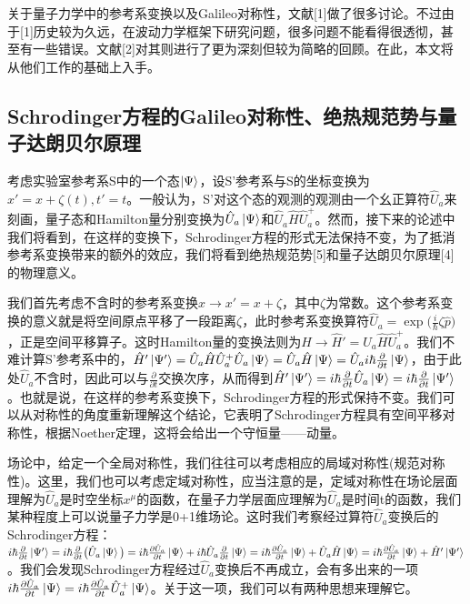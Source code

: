 \documentclass[a4paper]{article}
\begin{document}
        关于量子力学中的参考系变换以及Galileo对称性，文献[1]做了很多讨论。不过由于[1]历史较为久远，在波动力学框架下研究问题，很多问题不能看得很透彻，甚至有一些错误。文献[2]对其则进行了更为深刻但较为简略的回顾。在此，本文将从他们工作的基础上入手。

    \subsection{Schrodinger方程的Galileo对称性、绝热规范势与量子达朗贝尔原理}
        考虑实验室参考系S中的一个态$\ket{\Psi}$，设S'参考系与S的坐标变换为$x'=x+\zeta(t), t'=t$。一般认为，S'对这个态的观测的观测由一个幺正算符$\hat{U}_a$来刻画，量子态和Hamilton量分别变换为$\hat{U}_a\ket{\Psi}$和$\hat{U}_a\hat{H}\hat{U}_a^+$。然而，接下来的论述中我们将看到，在这样的变换下，Schrodinger方程的形式无法保持不变，为了抵消参考系变换带来的额外的效应，我们将看到绝热规范势[5]和量子达朗贝尔原理[4]的物理意义。

        我们首先考虑不含时的参考系变换$x\rightarrow x'=x+\zeta$，其中$\zeta$为常数。这个参考系变换的意义就是将空间原点平移了一段距离$\zeta$，此时参考系变换算符$\hat{U}_a=\exp\big(\frac{i}{\hbar}\zeta\hat{p} \big)$，正是空间平移算子。这时Hamilton量的变换法则为$\hat{H}\rightarrow \hat{H}'=\hat{U}_a\hat{H}\hat{U}_a^+$。我们不难计算S'参考系中的，$\hat{H}'\ket{\Psi'}=\hat{U}_a\hat{H}\hat{U}_a^+\hat{U}_a\ket{\Psi}=\hat{U}_a\hat{H}\ket{\Psi}=\hat{U}_a i\hbar\frac{\partial}{\partial t}\ket{\Psi}$，由于此处$\hat{U}_a$不含时，因此可以与$\frac{\partial}{\partial t}$交换次序，从而得到$\hat{H}'\ket{\Psi'}=i\hbar\frac{\partial}{\partial t}\hat{U}_a\ket{\Psi}=i\hbar\frac{\partial}{\partial t}\ket{\Psi'}$。也就是说，在这样的参考系变换下，Schrodinger方程的形式保持不变。我们可以从对称性的角度重新理解这个结论，它表明了Schrodinger方程具有空间平移对称性，根据Noether定理，这将会给出一个守恒量——动量。

        场论中，给定一个全局对称性，我们往往可以考虑相应的局域对称性(规范对称性)。这里，我们也可以考虑定域对称性，应当注意的是，定域对称性在场论层面理解为$\hat{U}_a$是时空坐标$x^\mu$的函数，在量子力学层面应理解为$\hat{U}_a$是时间t的函数，我们某种程度上可以说量子力学是0+1维场论。这时我们考察经过算符$\hat{U}_a$变换后的Schrodinger方程：$i\hbar\frac{\partial}{\partial t}\ket{\Psi'} = i\hbar\frac{\partial}{\partial t}\big(\hat{U}_a\ket{\Psi}\big) = i\hbar\frac{\partial\hat{U}_a}{\partial t}\ket{\Psi} + i\hbar\hat{U}_a\frac{\partial}{\partial t}\ket{\Psi} = i\hbar\frac{\partial\hat{U}_a}{\partial t}\ket{\Psi} + \hat{U}_a\hat{H}\ket{\Psi} = i\hbar\frac{\partial\hat{U}_a}{\partial t}\ket{\Psi} + \hat{H}'\ket{\Psi'}$。我们会发现Schrodinger方程经过$\hat{U}_a$变换后不再成立，会有多出来的一项$i\hbar\frac{\partial\hat{U}_a}{\partial t}\ket{\Psi} = i\hbar\frac{\partial\hat{U}_a}{\partial t}\hat{U}_a^+\ket{\Psi}$。关于这一项，我们可以有两种思想来理解它。
\end{document}
